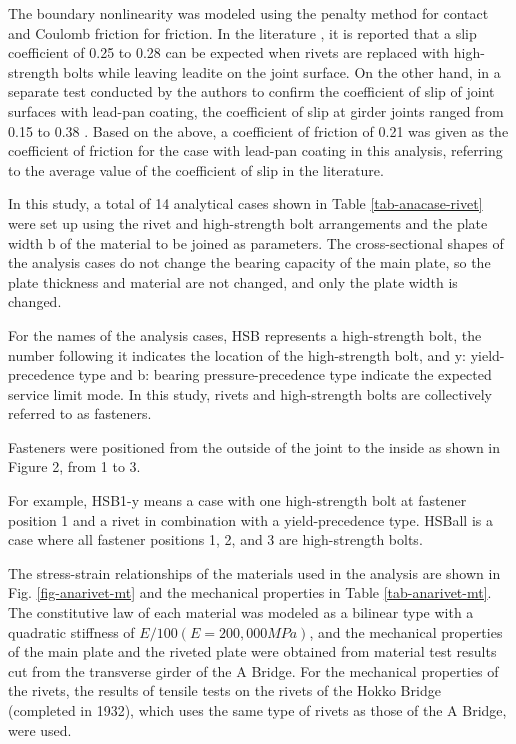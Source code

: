 The boundary nonlinearity was modeled using the penalty method for contact and Coulomb friction for friction. In the literature \cite{rtri1992Manual}, it is reported that a slip coefficient of 0.25 to 0.28 can be expected when rivets are replaced with high-strength bolts while leaving leadite on the joint surface. On the other hand, in a separate test conducted by the authors to confirm the coefficient of slip of joint surfaces with lead-pan coating, the coefficient of slip at girder joints ranged from 0.15 to 0.38 \cite{Chen2021}. Based on the above, a coefficient of friction of 0.21 was given as the coefficient of friction for the case with lead-pan coating in this analysis, referring to the average value of the coefficient of slip in the literature.

In this study, a total of 14 analytical cases shown in Table \ref{tab-anacase-rivet} were set up using the rivet and high-strength bolt arrangements and the plate width b of the material to be joined as parameters. The cross-sectional shapes of the analysis cases do not change the bearing capacity of the main plate, so the plate thickness and material are not changed, and only the plate width is changed.

For the names of the analysis cases, HSB represents a high-strength bolt, the number following it indicates the location of the high-strength bolt, and y: yield-precedence type and b: bearing pressure-precedence type indicate the expected service limit mode. In this study, rivets and high-strength bolts are collectively referred to as fasteners.

Fasteners were positioned from the outside of the joint to the inside as shown in Figure 2, from 1 to 3.

For example, HSB1-y means a case with one high-strength bolt at fastener position 1 and a rivet in combination with a yield-precedence type. HSBall is a case where all fastener positions 1, 2, and 3 are high-strength bolts.

The stress-strain relationships of the materials used in the analysis are shown in Fig. \ref{fig-anarivet-mt} and the mechanical properties in Table \ref{tab-anarivet-mt}. The constitutive law of each material was modeled as a bilinear type with a quadratic stiffness of $E/100 (E=200,000 MPa)$, and the mechanical properties of the main plate and the riveted plate were obtained from material test results cut from the transverse girder of the A Bridge. For the mechanical properties of the rivets, the results of tensile tests \cite{KOMATSU2015} on the rivets of the Hokko Bridge (completed in 1932), which uses the same type of rivets as those of the A Bridge, were used.


